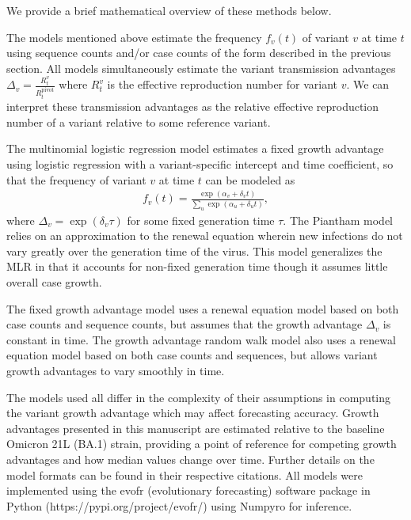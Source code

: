 \documentclass[11pt,oneside,letterpaper]{article}
\begin{document}
We provide a brief mathematical overview of these methods below.

The models mentioned above estimate the frequency  $f_{v}(t)$ of variant $v$ at time $t$ using sequence counts and/or case counts of the form described in the previous section.
All models simultaneously estimate the variant transmission advantages $\Delta_{v} = \frac{R_{t}^{v}}{R_{t}^{\text{pivot}}}$ where $R_{t}^{v}$ is the effective reproduction number for variant $v$.
We can interpret these transmission advantages as the relative effective reproduction number of a variant relative to some reference variant.

The multinomial logistic regression model estimates a fixed growth advantage using logistic regression with a variant-specific intercept and time coefficient, so that the frequency of variant $v$ at time $t$ can be modeled as
\begin{align*}
    f_{v}(t) = \frac{\exp(\alpha_{v} + \delta_{v} t)}{\sum_{u} \exp(\alpha_{u} + \delta_{u} t)},
\end{align*}
where $\Delta_{v} = \exp(\delta_{v} \tau)$ for some fixed generation time $\tau$.
The Piantham model relies on an approximation to the renewal equation wherein new infections do not vary greatly over the generation time of the virus.
This model generalizes the MLR in that it accounts for non-fixed generation time though it assumes little overall case growth. \cite{piantham2021estimating}

The fixed growth advantage model uses a renewal equation model based on both case counts and sequence counts, but assumes that the growth advantage $\Delta_{v}$ is constant in time. \cite{figgins2022sars}
The growth advantage random walk model also uses a renewal equation model based on both case counts and sequences, but allows variant growth advantages to vary smoothly in time. \cite{figgins2022sars}

The models used all differ in the complexity of their assumptions in computing the variant growth advantage which may affect forecasting accuracy.
Growth advantages presented in this manuscript are estimated relative to the baseline Omicron 21L (BA.1) strain, providing a point of reference for competing growth advantages and how median values change over time.
Further details on the model formats can be found in their respective citations.
All models were implemented using the evofr (evolutionary forecasting) software package in Python (https://pypi.org/project/evofr/) using Numpyro for inference.
\end{document}
